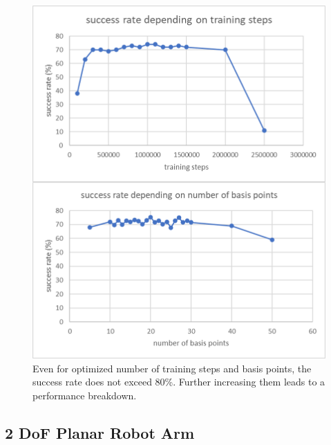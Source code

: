 \documentclass[conference]{IEEEtran}
\begin{document}
\begin{figure}[htbp]
	\centerline{\includegraphics{mobile.png}}
	\caption{Even for optimized number of training steps and basis points, the success rate does not exceed 80\%. Further increasing them leads to a performance breakdown.}
	\label{fig5}
\end{figure}

\subsection{2 DoF Planar Robot Arm}
\end{document}

